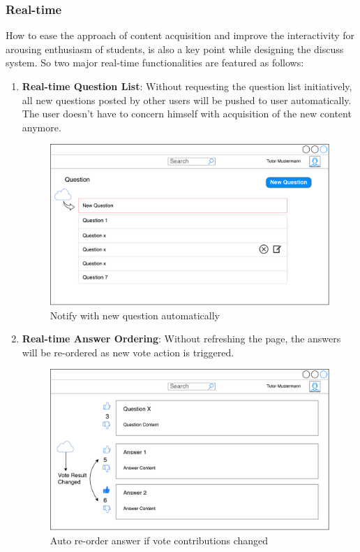 \subsubsection{Real-time}
How to ease the approach of content acquisition and improve the interactivity for arousing enthusiasm of students, is also a key point while designing the discuss system. So two major real-time functionalities are featured as follows: 


\begin{enumerate}
\item
\textbf{Real-time Question List}: Without requesting the question list initiatively, all new questions posted by other users will be pushed to user automatically. The user doesn't have to concern himself with acquisition of the new content anymore.

\begin{figure}[!htbp]
  \centering
    \includegraphics[width=1\textwidth]{Figures/mockup/question-notify.pdf}
  \caption{Notify with new question automatically}
\end{figure}

\item
\textbf{Real-time Answer Ordering}: Without refreshing the page, the answers will be re-ordered as new vote action is triggered.

\begin{figure}[!htbp]
  \centering
    \includegraphics[width=1\textwidth]{Figures/mockup/votechange.pdf}
  \caption{Auto re-order answer if vote contributions changed}
\end{figure}


\end{enumerate}
